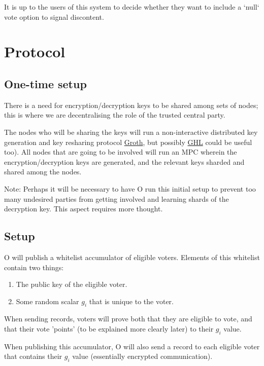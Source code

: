 \documentclass{article}
\begin{document}
It is up to the users of this system to decide whether they want to include a `null` vote option to signal discontent.

\section{Protocol}
\subsection{One-time setup}
There is a need for encryption/decryption keys to be shared among sets of nodes; this is where we are decentralising the role of the trusted central party.

The nodes who will be sharing the keys will run a non-interactive distributed key generation and key resharing protocol \href{https://eprint.iacr.org/2021/339.pdf}{Groth}, but possibly \href{https://eprint.iacr.org/2021/1397.pdf}{GHL} could be useful too). All nodes that are going to be involved will run an MPC wherein the encryption/decryption keys are generated, and the relevant keys sharded and shared among the nodes.

Note: Perhaps it will be necessary to have O run this initial setup to prevent too many undesired parties from getting involved and learning shards of the decryption key. This aspect requires more thought.

\subsection{Setup}
O will publish a whitelist accumulator of eligible voters. Elements of this whitelist contain two things:
\begin{enumerate}
    \item The public key of the eligible voter.
    \item Some random scalar $g_i$ that is unique to the voter.
\end{enumerate}

When sending records, voters will prove both that they are eligible to vote, and that their vote 'points' (to be explained more clearly later) to their $g_i$ value.

When publishing this accumulator, O will also send a record to each eligible voter that contains their $g_i$ value (essentially encrypted communication).
\end{document}
